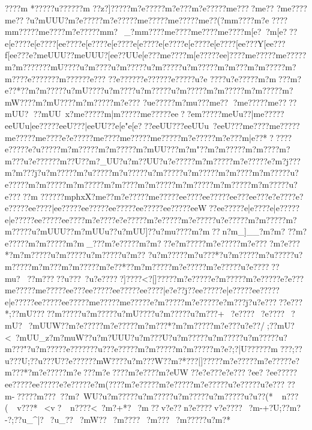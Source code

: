 {{{{{{{{{{{{{{{{{{{{{{{{{{{{{{{{{{{{{{{{{{{{{{{{{{{{{{{{{{{{{{{{{{{{{{{{{{{{{{{{{{{{{{{{{{{{{{{{{{{{{{{{{{{{{{{{{{{{{{{{{{{{{{{{{{{{{{{{{{???}?m
*?????u?????}?m ??z?}{]?????m?e?????m?e???m?e?????m{e????m{e??  ?m{e??? ?m{e?? ?u?mU}UU?m?e?????m?e?????m{e?????m{e?????m{e??( ?m{m????{m?e
????m{m?????m{e????{m?e?????m{m?~_?m{m????{m{e????{m{e????{m{e????{m[e??{m[e???{e[e????{e[e????[e{e????{e[e????{e[e????{e[e????{e[e????{e[e????{e[e????[e{e???Y[e{e???f[e{e???e?m{eUUU??m{eUUU?[e{e??UU{e[e??? {m{e????m[e?????e{e]????m{e?????m{e?????m?m???????mU????u?m?? ??u?m?????u?m?????u?m?????m?m???m?m?????m?m???}?e???????m?????}?e???
?}?e?????}?e?????}?e?????u?e
????u?e?????m?m???m?e??*??m?m?????u?mU????u?m????u?m?????u?m?????m?m?????m?m?????m?mW????m?mU????m?m?????m?e???
?u{e?????m?mu}???m{e??
?m{e?????m{e????mUU?
??mUU~x?m{e?????m|m?????m{e?????e{e??{e{m?????m{eUu??|m{e?????e{eUU}u|e{e?????e{eU???|e{eUU??{e[e"   {e[e?? ?e{eUU???e{eUUu~?e{eU???m{e????m{e?????m{e?????m{e????{e?e?????m{e????{m{e?????m{e?????m?e?????m?e???m|e??*?}\U
???}?e?????e?u?????m?m?????m?m?????m?mUU???m?m"?  ?m?m?????m?m????m?m???u?e?????}?m??}U?}?m?_UU?u?m??UU?u?e?????m?m?????m?e?????e?m?j???m?m???j?u?m?????m?u?????m?u?????u?m?????u?m?????m?m????m?m?????u?e?????m?m?????m?m?????m?m????m?m?????m?m?????m?m?????m?m?????u?e?????m
??????mphxX?m{e??{m?e?????m{e?????e{e????e{e?????e{e???e{e???{e?e????{e?e?????e{e????|e{e?????e{e?????e{e?????e{e?????e{e?????e{eW??e{e?????e|e????e|e?????e|e?????e{e?????e{e????{m?e????e?e?????m?e?????m?e?????u?e?????m?m?????m?m?????u?mUUU??m?mUUu??u?mUU]??u?mu????m?m?? n?m_]__?m?m?
? ?m?e?????m?m?????m?m_???m?e?????m?m}???e?m?????m?e?????m?e????m?e???*?m?m?????u?m?????u?m?????u?m??  ?u?m?????m?u???*?u?m?????m?u?????u?m?????m?m???m?m?????m?e??*??m?m?????m?e?????m?e?????u?e??????mu???m??? ??u???~?u?e?????{]????<?[]?????m?e?????e?m?????m?e?????e?e???m{e?????m{e?????e{e???e{e?????e{e?????e{e????|e?e??j??e{e?????e|e?????e{e?????e|e?????e{e?????e{e?????m{e?????m{e?????e?m?????m?e?????e?m???j?u?e????}?e???*;??mU?????m?????u?m?????u?mU????u?m?????u?m???+~?e????~?e????~?mU?~?mUUW??m?e?????m?e?????m?m???*?m?m?????m?e???u?e??/;??mU?<~?mUU_z?m?muW??u?m?UUU?u?m???U?u?m?????u?m?????u?m?????u?m???"?u?m??? ?}?e???????u?{{?}?e?????m?m?????m?m?????m?e?   ;?|U?????}?m???;??u???U;??u???U?}?e?????}?mW????u?m???W?}?m?*???}|]?????m?e?????m?e?????e?m???*?m?e?????m?e???m?e????m?e??}??m?eUW??e?e???e?e????e{e?   ?e{e?????e{e?????e{e?????e?e?????e?m(????m?e?????m?e?????m?e?????u?e?????u?e???
?}?m-?????m?????m?~WU?u?m?????u?m?????u?m?????u?m?????u?u??(*~n???(~v???*~<v  ?~n????<~?m?+*?~?m? ?v?e??n?e????v?e????~?m-+?U;??m?
-?;??u_^|?~?u}_??~?mW?? ~?m????~?m??? ~?m?????u?m?*
}}}}}}}}}}}}}}}}}}}}}}}}}}}}}}}}}}}}}}}}}}}}}}}}}}}}}}}}}}}}}}}}}}}}}}}}}}}}}}}}}}}}}}}}}}}}}}}}}}}}}}}}}}}}}}}}}}}}}}}}}}}}}}}}}}}}}}}}}}}}}}}}}}}}}}}}}}}}}}}}}}}}}}}}}}}}}}}}}}}}}}}}}}}}}}}}}}}}}}}}}}}}}}}}}}}}}}}}}}}}}}
